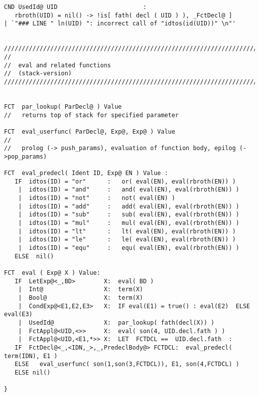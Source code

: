 \begin{verbatim}
CND UsedId@ UID                        :
   rbroth(UID) = nil() -> !is[ fath( decl ( UID ) ), _FctDecl@ ]
| `"### LINE " ln(UID) ": incorrect call of "idtos(id(UID))" \n"'


///////////////////////////////////////////////////////////////////////////
//
//  eval and related functions
//  (stack-version)
///////////////////////////////////////////////////////////////////////////
                         

FCT  par_lookup( ParDecl@ ) Value
//   returns top of stack for specified parameter

FCT  eval_userfunc( ParDecl@, Exp@, Exp@ ) Value
//   
//   prolog (-> push_params), evaluation of function body, epilog (->pop_params)

FCT  eval_predecl( Ident ID, Exp@ EN ) Value :
   IF  idtos(ID) = "or"      :   or( eval(EN), eval(rbroth(EN)) )
    |  idtos(ID) = "and"     :   and( eval(EN), eval(rbroth(EN)) )
    |  idtos(ID) = "not"     :   not( eval(EN) )
    |  idtos(ID) = "add"     :   add( eval(EN), eval(rbroth(EN)) )
    |  idtos(ID) = "sub"     :   sub( eval(EN), eval(rbroth(EN)) )
    |  idtos(ID) = "mul"     :   mul( eval(EN), eval(rbroth(EN)) )
    |  idtos(ID) = "lt"      :   lt( eval(EN), eval(rbroth(EN)) )
    |  idtos(ID) = "le"      :   le( eval(EN), eval(rbroth(EN)) )
    |  idtos(ID) = "equ"     :   equ( eval(EN), eval(rbroth(EN)) )
   ELSE  nil()

FCT  eval ( Exp@ X ) Value:
   IF  LetExp@<_,BD>        X:  eval( BD )
    |  Int@                 X:  term(X)
    |  Bool@                X:  term(X)
    |  CondExp@<E1,E2,E3>   X:  IF eval(E1) = true() : eval(E2)  ELSE  eval(E3) 
    |  UsedId@              X:  par_lookup( fath(decl(X)) )
    |  FctAppl@<UID,<>>     X:  eval( son(4, UID.decl.fath ) )
    |  FctAppl@<UID,<E1,*>> X:  LET  FCTDCL ==  UID.decl.fath  :
   IF  FctDecl@<_,<IDN,_>,_,PredeclBody@> FCTDCL:  eval_predecl( term(IDN), E1 )
   ELSE   eval_userfunc( son(1,son(3,FCTDCL)), E1, son(4,FCTDCL) )
   ELSE nil()

}

\end{verbatim}

